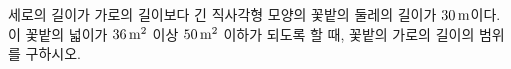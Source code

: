 세로의 길이가 가로의 길이보다 긴 직사각형 모양의 꽃밭의 둘레의 길이가 $30\mkern3mu \mathrm{m}$이다. 이 꽃밭의 넓이가 $36\mkern3mu \mathrm{m}^2$ 이상 $50\mkern3mu \mathrm{m}^2$ 이하가 되도록 할 때, 꽃밭의 가로의 길이의 범위를 구하시오.
